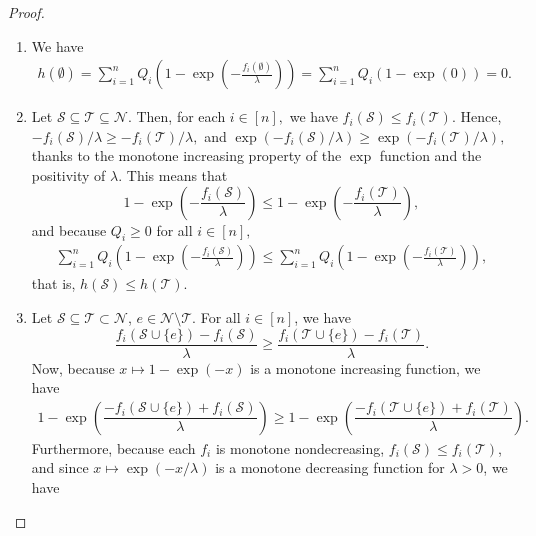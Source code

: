 \documentclass[10pt,a4paper]{amsart}
\def\lp{\left(}
\def\rp{\right)}
\def\sN{\mathcal{N}}
\def\sS{\mathcal{S}}
\begin{document}
\begin{proof}
\begin{enumerate}[label=\bfseries(\roman*), leftmargin=*, itemsep=2pt]
\item We have
\begin{equation}
\begin{split}
h(\emptyset) = \sum_{i=1}^nQ_i\lp1-\exp{\lp-\frac{f_i(\emptyset)}{\lambda}\rp}\rp 
= \sum_{i=1}^nQ_i\lp1-\exp{\lp0\rp}\rp = 0.
\end{split}
\end{equation}
\item Let $\sS \subseteq \mathcal{T} \subseteq \sN$. Then, for each $i \in [n],$ we have $f_i(\sS) \leq f_i(\mathcal{T}).$ Hence, $-f_i(\sS)/\lambda \geq - f_i(\mathcal{T})/\lambda,$ and $\exp(-f_i(\sS)/\lambda) \geq \exp(-f_i(\mathcal{T})/\lambda),$ thanks to the monotone increasing property of the $\exp$ function and the positivity of $\lambda$. This means that 
\begin{equation}
1-\exp\lp -\frac{f_i(\sS)}{\lambda}\rp \leq  1-\exp\lp -\frac{f_i(\mathcal{T})}{\lambda}\rp,
\end{equation}
and because $Q_i \geq 0$ for all $i \in [n],$ 
\begin{equation}
\begin{split}
\sum_{i=1}^nQ_i\lp1-\exp\lp -\frac{f_i(\sS)}{\lambda}\rp \rp \leq \sum_{i=1}^nQ_i\lp1-\exp\lp -\frac{f_i(\mathcal{T})}{\lambda}\rp\rp,
\end{split}
\end{equation}
that is, $h(\sS) \leq h(\mathcal{T})$.
\item Let $\sS \subseteq \mathcal{T} \subset \sN$, $e \in \sN \setminus \mathcal{T}$. For all $i \in [n]$, we have
\begin{equation}
\dfrac{f_i(\sS \cup \{e\}) - f_i(\sS)}{\lambda} \geq \dfrac{f_i(\mathcal{T} \cup \{e\}) - f_i(\mathcal{T})}{\lambda}.
\end{equation}
Now, because $x\mapsto 1-\exp(-x)$ is a monotone increasing function, we have
\begin{equation}\label{eq:multiplythis}
\begin{split}
1-\exp\lp\dfrac{-f_i(\sS \cup \{e\}) + f_i(\sS)}{\lambda}\rp \geq 1-\exp\lp\dfrac{-f_i(\mathcal{T} \cup \{e\}) + f_i(\mathcal{T})}{\lambda} \rp.
\end{split}
\end{equation}
Furthermore, because each $f_i$ is monotone nondecreasing, $f_i(\sS) \leq f_i(\mathcal{T})$, and since $x\mapsto \exp(-x/\lambda)$ is a monotone decreasing function for $\lambda > 0$, we have

\end{enumerate}
\end{proof}
\end{document}
